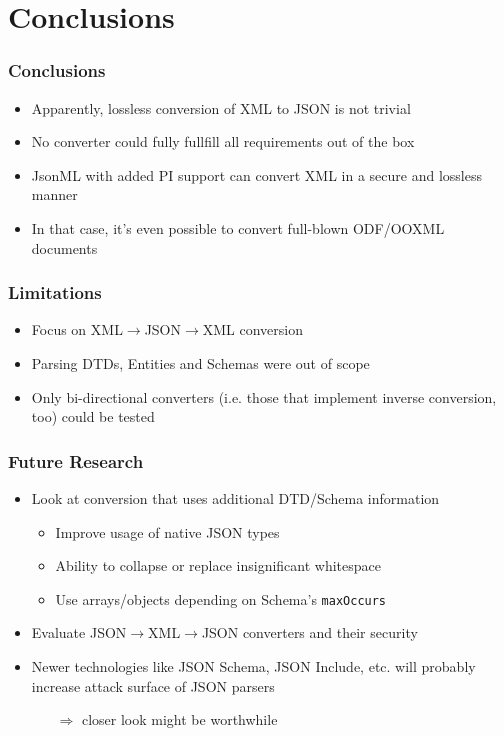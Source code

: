 \documentclass[
    alternativetitlepage=alternativ,
    cornerlogo=hgi_nds_logo2,
    sectionoverview,
]{rubpresentation}
\begin{document}
\section{Conclusions}

\begin{frame}
  \frametitle{Conclusions}
  \begin{itemize}
    \item{} Apparently, lossless conversion of XML to JSON is not trivial
    \item{} No converter could fully fullfill all requirements out of the box
    \item{} JsonML with added PI support can convert XML in a secure and
      lossless manner
    \item{} In that case, it's even possible to convert full-blown ODF/OOXML documents
  \end{itemize}
\end{frame}

\begin{frame}
  \frametitle{Limitations}
  \begin{itemize}
    \item{} Focus on XML$\rightarrow$JSON$\rightarrow$XML conversion
    \item{} Parsing DTDs, Entities and Schemas were out of scope
    \item{} Only bi-directional converters (i.e. those that implement inverse
      conversion, too) could be tested
  \end{itemize}
\end{frame}

\begin{frame}
  \frametitle{Future Research}
  \begin{itemize}
    \item{} Look at conversion that uses additional DTD/Schema information
    \begin{itemize}
      \item{} Improve usage of native JSON types
      \item{} Ability to collapse or replace insignificant whitespace
      \item{} Use arrays/objects depending on Schema's \texttt{maxOccurs}
    \end{itemize}
  \item{} Evaluate JSON$\rightarrow$XML$\rightarrow$JSON converters and their
    security
  \item{} Newer technologies like JSON Schema, JSON Include, etc. will probably
    increase attack surface of JSON parsers
    \begin{itemize}
      \item[$\Rightarrow$] closer look might be worthwhile
    \end{itemize}
  \end{itemize}
\end{frame}
\end{document}
